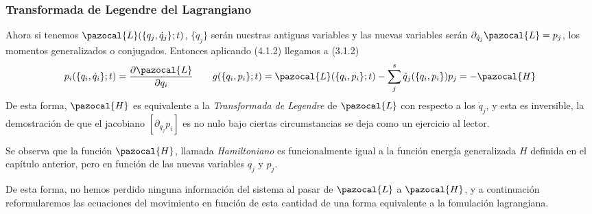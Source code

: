 \subsubsection{Transformada de Legendre del Lagrangiano}
Ahora si tenemos $\pazocal{L}(\{q_j,\dot{q}_j\};t)$, $\{\dot{q}_j\}$ serán nuestras antiguas variables y las nuevas variables serán $\partial_{\dot{q}_j}\pazocal{L}=p_j$, los momentos generalizados o conjugados. Entonces aplicando (4.1.2) llegamos a (3.1.2)
\begin{equation} \label{4.1.3}
        p_i(\{q_i,\dot{q}_i\};t)=\frac{\partial \pazocal{L}}{\partial q_i} \ \ \ \ \ \  g(\{q_i,p_i\};t) =\pazocal{L}(\{q_i,p_i\};t) -\sum_j^s \dot{q}_j (\{q_i,p_i\}) p_j = -\pazocal{H}
\end{equation} 
De esta forma, $\pazocal{H}$ es equivalente a la \textit{Transformada de Legendre} de $\pazocal{L}$ con respecto a los $\dot{q}_j$, y esta es inversible, la demostración de que el jacobiano $[\partial_{\dot{q}_j}p_i]$ es no nulo bajo ciertas circumstancias se deja como un ejercicio al lector.

Se observa que la función $\pazocal{H}$, llamada \textit{Hamiltoniano} es funcionalmente igual a la función energía generalizada $H$ definida en el capítulo anterior, pero en función de las nuevas variables $q_j$ y $p_j$.

De esta forma, no hemos perdido ninguna información del sistema al pasar de $\pazocal{L}$ a $\pazocal{H}$, y a continuación reformularemos las ecuaciones del movimiento en función de esta cantidad de una forma equivalente a la fomulación lagrangiana.
